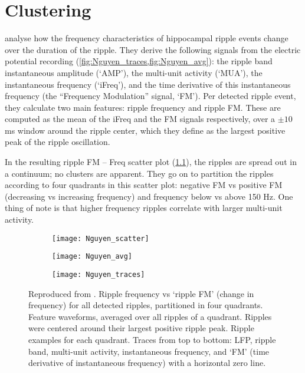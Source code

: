 
\chapter{Clustering}


 analyse how the frequency characteristics of hippocampal ripple events change over the duration of the ripple. They derive the following signals from the electric potential recording (\cref{fig:Nguyen_traces,fig:Nguyen_avg}): the ripple band instantaneous amplitude (`AMP'), the multi-unit activity (`MUA'), the instantaneous frequency (`iFreq'), and the time derivative of this instantaneous frequency (the ``Frequency Modulation'' signal, `FM'). Per detected ripple event, they calculate two main features: ripple frequency and ripple FM. These are computed as the mean of the iFreq and the FM signals respectively, over a $\pm 10$ ms window around the ripple center, which they define as the largest positive peak of the ripple oscillation.

In the resulting ripple FM -- Freq scatter plot (\cref{fig:Nguyen_scatter}), the ripples are spread out in a continuum; no clusters are apparent. They go on to partition the ripples according to four quadrants in this scatter plot: negative FM vs positive FM (decreasing vs increasing frequency) and frequency below vs above 150 Hz. One thing of note is that higher frequency ripples correlate with larger multi-unit activity.

\begin{figure}
    \begin{subfigure}{0.6\textwidth}
        \caption{}
        \label{fig:Nguyen_scatter}
        \texttt{[image: Nguyen\_scatter]}
    \end{subfigure}
    \begin{subfigure}{0.65\textwidth}
        \caption{}
        \label{fig:Nguyen_avg}
        \texttt{[image: Nguyen\_avg]}
    \end{subfigure}
    \begin{subfigure}{0.8\textwidth}
        \caption{}
        \label{fig:Nguyen_traces}
        \texttt{[image: Nguyen\_traces]}
    \end{subfigure}
    \caption
    { Reproduced from \protect\footnotemark.
     Ripple frequency vs `ripple FM' (change in frequency) for all detected ripples, partitioned in four quadrants.
     Feature waveforms, averaged over all ripples of a quadrant. Ripples were centered around their largest positive ripple peak.
     Ripple examples for each quadrant. Traces from top to bottom: LFP, ripple band, multi-unit activity, instantaneous frequency, and `FM' (time derivative of instantaneous frequency) with a horizontal zero line.
    }
    \label{fig:Nguyen}
\end{figure}
